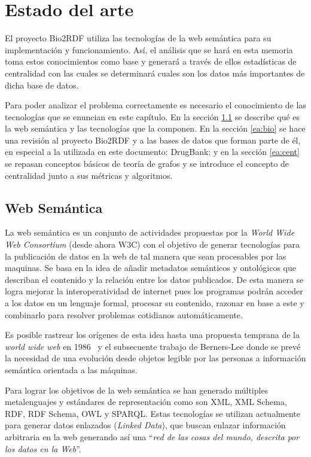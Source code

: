 
\chapter{Estado del arte}
El proyecto Bio2RDF utiliza las tecnologías de la web semántica para su
implementación y funcionamiento. Así, el análisis que se hará en esta memoria
toma estos conocimientos como base y generará a través de ellos estadísticas de
centralidad con las cuales se determinará cuales son los datos más importantes
de dicha base de datos.

Para poder analizar el problema correctamente es necesario el conocimiento de
las tecnologías que se enuncian en este capítulo. En la sección \ref{ea:ws} se
describe qué es la web semántica y las tecnologías que la componen.
En la sección \ref{ea:bio} se hace una revisión al proyecto Bio2RDF y a las
bases de datos que forman parte de él, en especial a la utilizada en este
documento: DrugBank; y en la sección \ref{ea:cent} se repasan conceptos básicos
de teoría de grafos y se introduce el concepto de centralidad junto a sus
métricas y algoritmos.

\section{Web Semántica}\label{ea:ws}
La web semántica es un conjunto de actividades propuestas por la \emph{World
Wide Web Consortium} (desde ahora W3C) con el objetivo de generar tecnologías
para la publicación de datos en la web de tal manera que sean procesables por
las maquinas. 
Se basa en la idea de añadir metadatos semánticos y ontológicos que describan el
contenido y la relación entre los datos publicados. De esta manera se logra
mejorar la interoperatividad de internet pues los programas podrán acceder a los
datos en un lenguaje formal, procesar su contenido, razonar en base a este y
combinarlo para resolver problemas cotidianos automáticamente.

Es posible rastrear los orígenes de esta idea hasta una propuesta temprana de la
\emph{world wide web} en 1986~\cite{berners1989proposal} y el subsecuente
trabajo de Berners-Lee \etal\cite{berners1992world} donde se prevé la
necesidad de una evolución desde objetos legible por las personas a información
semántica orientada a las máquinas.

Para lograr los objetivos de la web semántica se han generado múltiples
metalenguajes y estándares de representación como son XML, XML Schema, RDF,
RDF Schema, OWL y SPARQL. Estas tecnologías se utilizan actualmente para generar
datos enlazados (\emph{Linked Data}), que buscan enlazar información arbitraria
en la web generando así una ``\emph{red de las cosas del mundo, descrita por los
datos en la Web}''\cite{berners2011linked}.

